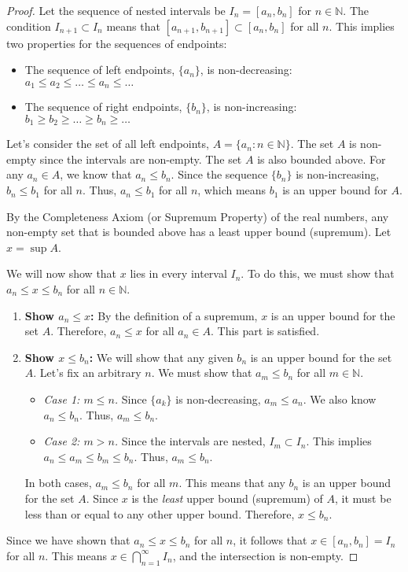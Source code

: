 \documentclass[12pt,a4paper]{article}
\theoremstyle{definition}
\theoremstyle{remark}
\begin{document}
\begin{proof}
Let the sequence of nested intervals be $I_n = [a_n, b_n]$ for $n \in \mathbb{N}$. The condition $I_{n+1} \subset I_n$ means that $[a_{n+1}, b_{n+1}] \subset [a_n, b_n]$ for all $n$. This implies two properties for the sequences of endpoints:
\begin{itemize}
    \item The sequence of left endpoints, $\{a_n\}$, is non-decreasing: $a_1 \le a_2 \le \dots \le a_n \le \dots$
    \item The sequence of right endpoints, $\{b_n\}$, is non-increasing: $b_1 \ge b_2 \ge \dots \ge b_n \ge \dots$
\end{itemize}

Let's consider the set of all left endpoints, $A = \{a_n : n \in \mathbb{N}\}$.
The set $A$ is non-empty since the intervals are non-empty. The set $A$ is also bounded above. For any $a_n \in A$, we know that $a_n \le b_n$. Since the sequence $\{b_n\}$ is non-increasing, $b_n \le b_1$ for all $n$. Thus, $a_n \le b_1$ for all $n$, which means $b_1$ is an upper bound for $A$.

By the Completeness Axiom (or Supremum Property) of the real numbers, any non-empty set that is bounded above has a least upper bound (supremum). Let $x = \sup A$.

We will now show that $x$ lies in every interval $I_n$. To do this, we must show that $a_n \le x \le b_n$ for all $n \in \mathbb{N}$.

\begin{enumerate}
    \item \textbf{Show $a_n \le x$:} By the definition of a supremum, $x$ is an upper bound for the set $A$. Therefore, $a_n \le x$ for all $a_n \in A$. This part is satisfied.

    \item \textbf{Show $x \le b_n$:} We will show that any given $b_n$ is an upper bound for the set $A$. Let's fix an arbitrary $n$. We must show that $a_m \le b_n$ for all $m \in \mathbb{N}$.
    \begin{itemize}
        \item \textit{Case 1: $m \le n$.} Since $\{a_k\}$ is non-decreasing, $a_m \le a_n$. We also know $a_n \le b_n$. Thus, $a_m \le b_n$.
        \item \textit{Case 2: $m > n$.} Since the intervals are nested, $I_m \subset I_n$. This implies $a_n \le a_m \le b_m \le b_n$. Thus, $a_m \le b_n$.
    \end{itemize}
    In both cases, $a_m \le b_n$ for all $m$. This means that any $b_n$ is an upper bound for the set $A$. Since $x$ is the \emph{least} upper bound (supremum) of $A$, it must be less than or equal to any other upper bound. Therefore, $x \le b_n$.
\end{enumerate}

Since we have shown that $a_n \le x \le b_n$ for all $n$, it follows that $x \in [a_n, b_n] = I_n$ for all $n$. This means $x \in \bigcap_{n=1}^{\infty} I_n$, and the intersection is non-empty.
\end{proof}
\end{document}
